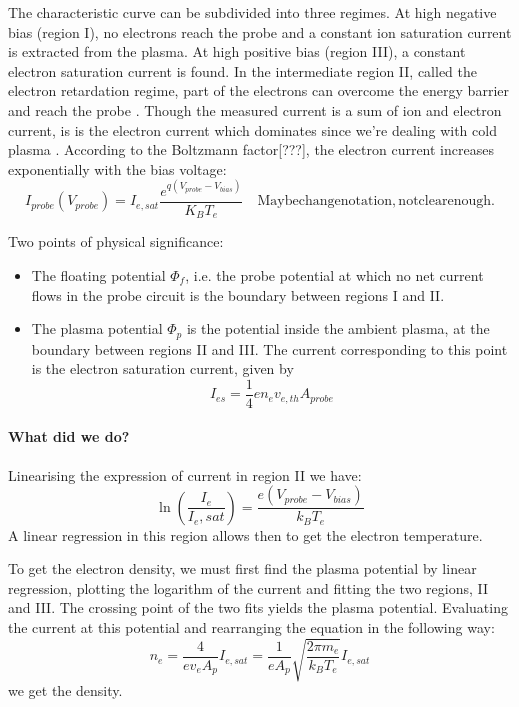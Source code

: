 The characteristic curve can be subdivided into three regimes. At high negative bias (region I), no electrons reach the probe and a constant ion saturation current is extracted from the plasma. 
At high positive bias (region III), a constant electron saturation current is found. 
In the intermediate region II, called the electron retardation regime, part of the electrons can overcome the energy barrier and reach the probe \cite{piel_plasma_2017}. 
Though the measured current is a sum of ion and electron current, is is the electron current which dominates since we're dealing with cold plasma \cite{sanjines_notice_2014}.
According to the Boltzmann factor[???], the electron current increases exponentially with the bias voltage:
\begin{equation}
    I_{probe}(V_{probe}) = I_{e,sat} \frac{e^{q(V_{probe} - V_{bias})}}{K_B T_e} \quad \mathrm{Maybe change notation, not clear enough.}
\end{equation}

Two points of physical significance:
\begin{itemize}
    \item The floating potential $\Phi_f$, i.e. the probe potential at which no net current flows in the probe circuit is the boundary between regions I and II.
    \item The plasma potential $\Phi_p$ is the potential inside the ambient plasma, at the boundary between regions II and III. The current corresponding to this point is the electron saturation current, given by
    \begin{equation}
        I_{es} = \frac{1}{4}e n_e v_{e,th} A_{probe}
    \end{equation}
\end{itemize}

\paragraph{What did we do?}
Linearising the expression of current in region II we have:
\begin{equation}
    \ln\left(\frac{I_e}{I_e,sat} \right) = \frac{e(V_{probe} - V_{bias})}{k_B T_e}
\end{equation} 
A linear regression in this region allows then to get the electron temperature.

To get the electron density, we must first find the plasma potential by linear regression, plotting the logarithm of the current and fitting the two regions, II and III.
The crossing point of the two fits yields the plasma potential.
Evaluating the current at this potential and rearranging the equation in the following way:
\begin{equation}
    n_e = \frac{4}{e v_e A_p} I_{e,sat} = \frac{1}{e A_p} \sqrt{\frac{2 \pi m_e}{k_B T_e}} I_{e,sat}
\end{equation}
we get the density.

